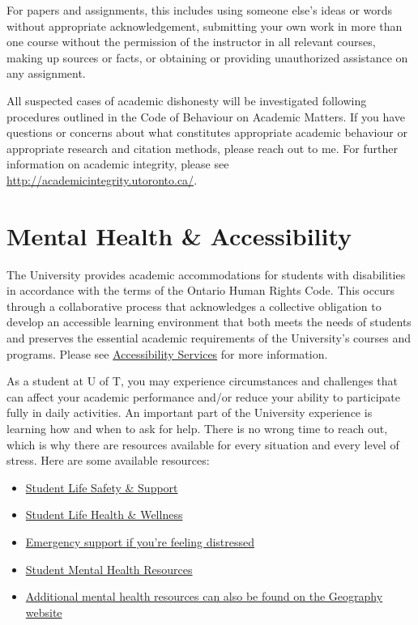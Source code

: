 \documentclass[11pt]{article}
\begin{document}
	For papers and assignments, this includes using someone else's ideas or words without appropriate acknowledgement, submitting your own work in more than one course without the permission of the instructor in all relevant courses,	making up sources or facts, or obtaining or providing unauthorized assistance on any assignment.
	
	All suspected cases of academic dishonesty will be investigated following procedures outlined in the Code of Behaviour on Academic Matters. If you have questions or concerns about what constitutes appropriate academic behaviour or appropriate research and citation methods, please reach out to me. For further information on academic integrity, please see \url{http://academicintegrity.utoronto.ca/}.
	
	
	\section*{Mental Health \& Accessibility}
	
	The University provides academic accommodations for students with disabilities in accordance with the terms of the Ontario Human Rights Code. This occurs through a collaborative process that acknowledges a collective obligation to develop an accessible learning environment that both meets the needs of students and preserves the essential academic requirements of the University's courses and programs. Please see \href{https://studentlife.utoronto.ca/department/accessibility-services/}{Accessibility Services} for more information.
	
	As a student at U of T, you may experience circumstances and challenges that can affect your academic performance and/or reduce your ability to participate fully in daily activities. An important part of the University experience is learning how and when to ask for help. There is no wrong time to reach out, which is why there are resources available for every situation and every level of stress. Here are some available resources:
	
	\begin{itemize}
		
		
		\item \href{https://safety.utoronto.ca/}{Student Life Safety \& Support}
		\item \href{https://studentlife.utoronto.ca/department/health-wellness/}{Student Life Health \& Wellness}
		\item \href{https://studentlife.utoronto.ca/task/support-when-you-feel-distressed/}{Emergency support if you’re feeling distressed}
		
		\item \href{https://mentalhealth.utoronto.ca/}{Student Mental Health Resources}
		
		\item  \href{https://geography.utoronto.ca/department/mental-health-resources/}{Additional mental health resources can also be found on the Geography website}
	\end{itemize}
\end{document}
